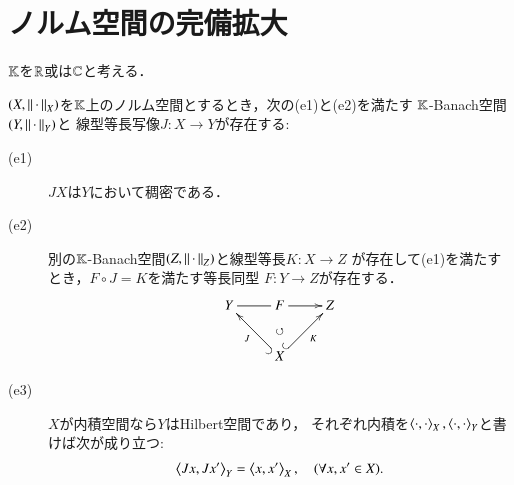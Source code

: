 \section{ノルム空間の完備拡大}
	$\mathbb{K}$を$\mathbb{R}$或は$\mathbb{C}$と考える．
	\begin{screen}
		\begin{thm}[任意のノルム空間には完備拡大が存在する]\label{thm:expansion_of_normed_space}
			$(X,\left\|\, \cdot\, \right\|_{X})$を$\mathbb{K}$上のノルム空間とするとき，次の(e1)と(e2)を満たす
			$\mathbb{K}$-Banach空間$(Y,\left\|\, \cdot\, \right\|_{Y})$と
			線型等長写像$J:X \longrightarrow Y$が存在する:
			\begin{description}
				\item[(e1)] $JX$は$Y$において稠密である．
				\item[(e2)] 別の$\mathbb{K}$-Banach空間$(Z,\left\|\, \cdot\, \right\|_{Z})$と線型等長$K:X \longrightarrow Z$
					が存在して(e1)を満たすとき，$F \circ J = K$を満たす等長同型
					$F:Y \longrightarrow Z$が存在する．
					\begin{align}
						\xymatrix{
							Y \ar@{-}[r] & F \ar[r] & Z \\
							& X \ar@{^{(}->}[lu]^-J \ar@{}[u]|\circlearrowleft \ar@{^{(}->}[ru]_-K & 
						}
					\end{align}
				\item[(e3)] $X$が内積空間なら$Y$はHilbert空間であり，
					それぞれ内積を$\inprod<\cdot,\cdot>_X,\inprod<\cdot,\cdot>_Y$と書けば次が成り立つ:
					\begin{align}
						\inprod<J x, J x'>_Y = \inprod<x,x'>_X,
						\quad (\forall x,x' \in X).
					\end{align}
			\end{description}
		\end{thm}
	\end{screen}
	
